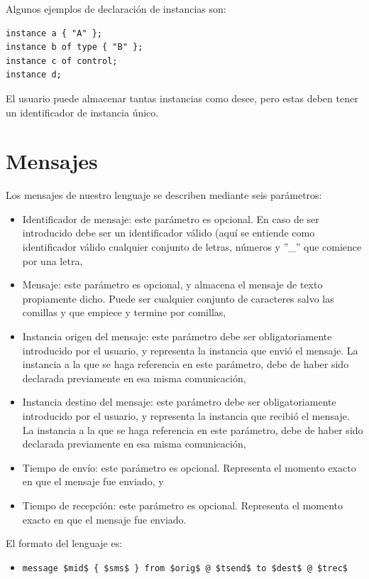 \documentclass[12pt,a4paper]{report}
\begin{document}
Algunos ejemplos de declaración de instancias son:

\begin{lstlisting}
instance a { "A" };
instance b of type { "B" };
instance c of control;
instance d;
\end{lstlisting}

El usuario puede almacenar tantas instancias como desee, pero estas deben tener un identificador de instancia único.

\section{Mensajes}

Los mensajes de nuestro lenguaje se describen mediante seis parámetros:

\begin{itemize}
\item Identificador de mensaje: este parámetro es opcional. En caso de ser introducido debe ser un identificador válido (aquí se entiende como identificador válido cualquier conjunto de letras, números y ''\_'' que comience por una letra,
\item Mensaje: este parámetro es opcional, y almacena el mensaje de texto propiamente dicho. Puede ser cualquier conjunto de caracteres salvo las comillas y que empiece y termine por comillas,
\item Instancia origen del mensaje: este parámetro debe ser obligatoriamente introducido por el usuario, y representa la instancia que envió el mensaje. La instancia a la que se haga referencia en este parámetro, debe de haber sido declarada previamente en esa misma comunicación,
\item Instancia destino del mensaje: este parámetro debe ser obligatoriamente introducido por el usuario, y representa la instancia que recibió el mensaje. La instancia a la que se haga referencia en este parámetro, debe de haber sido declarada previamente en esa misma comunicación,
\item Tiempo de envío: este parámetro es opcional. Representa el momento exacto en que el mensaje fue enviado, y
\item Tiempo de recepción: este parámetro es opcional. Representa el momento exacto en que el mensaje fue enviado.
\end{itemize}

El formato del lenguaje es:

\begin{itemize}
\item \lstinline[mathescape]!message $mid$ { $sms$ } from $orig$ @ $tsend$ to $dest$ @ $trec$!
\end{itemize}
\end{document}

